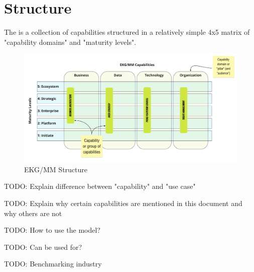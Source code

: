 \chapter{Structure}\label{ch:ekg-mm-structure}

The  is a collection of capabilities structured in a relatively simple 4x5 matrix of
"capability domains" and "maturity levels".

\begin{figure}[ht]
    \centering
    \includegraphics[width=\textwidth]{../images/ekg-mm-structure.pdf}
    \caption{EKG/MM Structure}
    \label{fig:ekg-mm-structure}
\end{figure}





TODO: Explain difference between "capability" and "use case"

TODO: Explain why certain capabilities are mentioned in this document and why others are not

TODO: How to use the model?

TODO: Can be used for?

TODO: Benchmarking industry



